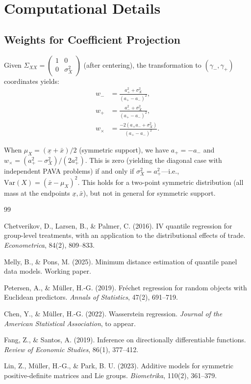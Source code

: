 \documentclass[12pt]{article}
\newcommand{\xbar}{\underline{x}}
\newcommand{\xbaru}{\bar{x}}
\begin{document}
\section{Computational Details}

\subsection{Weights for Coefficient Projection}

Given $\Sigma_{XX} = \begin{pmatrix} 1 & 0 \\ 0 & \sigma_X^2 \end{pmatrix}$ (after centering), the transformation to $(\gamma_-, \gamma_+)$ coordinates yields:
\begin{align}
w_- &= \frac{a_+^2 + \sigma_X^2}{(a_+ - a_-)^2}, \\
w_+ &= \frac{a_-^2 + \sigma_X^2}{(a_+ - a_-)^2}, \\
w_\times &= \frac{-2(a_+ a_- + \sigma_X^2)}{(a_+ - a_-)^2}.
\end{align}

When $\mu_X = (\xbar + \xbaru)/2$ (symmetric support), we have $a_+ = -a_-$ and $w_\times = (a_+^2 - \sigma_X^2)/(2a_+^2)$. This is zero (yielding the diagonal case with independent PAVA problems) if and only if $\sigma_X^2 = a_+^2$---i.e., $\text{Var}(X) = (\xbaru - \mu_X)^2$. This holds for a two-point symmetric distribution (all mass at the endpoints $\xbar, \xbaru$), but not in general for symmetric support.

\begin{thebibliography}{99}

 Chetverikov, D., Larsen, B., \& Palmer, C. (2016). IV quantile regression for group-level treatments, with an application to the distributional effects of trade. \textit{Econometrica}, 84(2), 809--833.

 Melly, B., \& Pons, M. (2025). Minimum distance estimation of quantile panel data models. Working paper.

 Petersen, A., \& M{\"u}ller, H.-G. (2019). Fr{\'e}chet regression for random objects with Euclidean predictors. \textit{Annals of Statistics}, 47(2), 691--719.

 Chen, Y., \& M{\"u}ller, H.-G. (2022). Wasserstein regression. \textit{Journal of the American Statistical Association}, to appear.

 Fang, Z., \& Santos, A. (2019). Inference on directionally differentiable functions. \textit{Review of Economic Studies}, 86(1), 377--412.

 Lin, Z., M{\"u}ller, H.-G., \& Park, B. U. (2023). Additive models for symmetric positive-definite matrices and Lie groups. \textit{Biometrika}, 110(2), 361--379.

\end{thebibliography}
\end{document}

